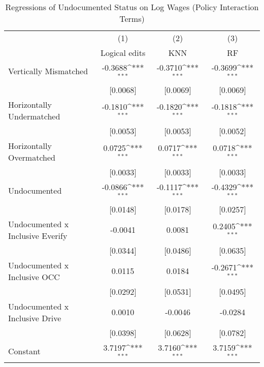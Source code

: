 \begin{table}[htbp]\centering
\def\sym#1{\ifmmode^{#1}\else\(^{#1}\)\fi}
\caption{Regressions of Undocumented Status on Log Wages (Policy Interaction Terms)}
\begin{tabular}{l*{3}{c}}
\toprule
                    &\multicolumn{1}{c}{(1)}         &\multicolumn{1}{c}{(2)}         &\multicolumn{1}{c}{(3)}         \\
                    &Logical edits         &         KNN         &          RF         \\
\midrule
Vertically Mismatched&     -0.3688\sym{***}&     -0.3710\sym{***}&     -0.3699\sym{***}\\
                    &    [0.0068]         &    [0.0069]         &    [0.0069]         \\
\addlinespace
Horizontally Undermatched&     -0.1810\sym{***}&     -0.1820\sym{***}&     -0.1818\sym{***}\\
                    &    [0.0053]         &    [0.0053]         &    [0.0052]         \\
\addlinespace
Horizontally Overmatched&      0.0725\sym{***}&      0.0717\sym{***}&      0.0718\sym{***}\\
                    &    [0.0033]         &    [0.0033]         &    [0.0033]         \\
\addlinespace
Undocumented        &     -0.0866\sym{***}&     -0.1117\sym{***}&     -0.4329\sym{***}\\
                    &    [0.0148]         &    [0.0178]         &    [0.0257]         \\
\addlinespace
Undocumented x Inclusive Everify&     -0.0041         &      0.0081         &      0.2405\sym{***}\\
                    &    [0.0344]         &    [0.0486]         &    [0.0635]         \\
\addlinespace
Undocumented x Inclusive OCC&      0.0115         &      0.0184         &     -0.2671\sym{***}\\
                    &    [0.0292]         &    [0.0531]         &    [0.0495]         \\
\addlinespace
Undocumented x Inclusive Drive&      0.0010         &     -0.0046         &     -0.0284         \\
                    &    [0.0398]         &    [0.0628]         &    [0.0782]         \\
\addlinespace
Constant            &      3.7197\sym{***}&      3.7160\sym{***}&      3.7159\sym{***}\\

\end{tabular}
\end{table}
